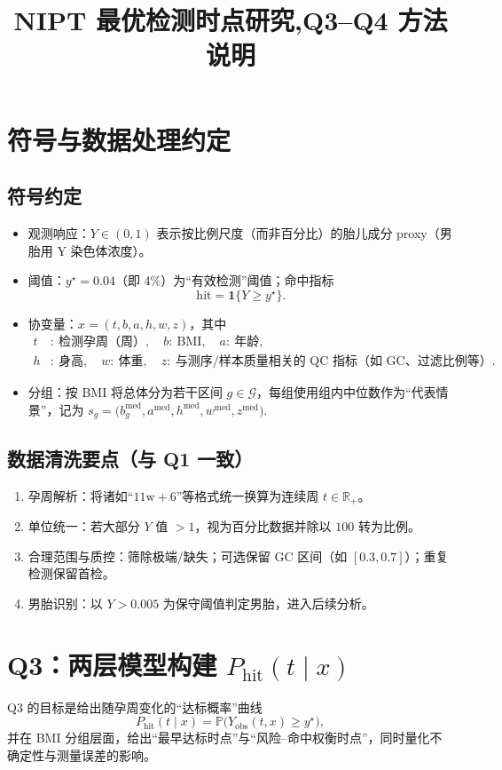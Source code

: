 \documentclass[11pt,a4paper]{article}
\title{NIPT 最优检测时点研究,Q3--Q4 方法说明}
\author{}
\date{}
\begin{document}
\maketitle
\tableofcontents

\section{符号与数据处理约定}
\subsection{符号约定}
\begin{itemize}
  \item 观测响应：$Y\in(0,1)$ 表示按比例尺度（而非百分比）的胎儿成分 proxy（男胎用 Y 染色体浓度）。
  \item 阈值：$y^\star=0.04$（即 4\%）为“有效检测”阈值；命中指标
  \[
    \text{hit} = \mathbf{1}\{Y \ge y^\star\}.
  \]
  \item 协变量：$x=(t, b, a, h, w, z)$，其中
  \begin{align*}
    t&:\ \text{检测孕周（周）},\quad
    b:\ \text{BMI},\quad
    a:\ \text{年龄},\\
    h&:\ \text{身高},\quad
    w:\ \text{体重},\quad
    z:\ \text{与测序/样本质量相关的 QC 指标（如 GC、过滤比例等）}.
  \end{align*}
  \item 分组：按 BMI 将总体分为若干区间 $g\in\mathcal{G}$，每组使用组内中位数作为“代表情景”，记为
  \(
  s_g=\bigl(b_g^{\text{med}}, a^{\text{med}}, h^{\text{med}}, w^{\text{med}}, z^{\text{med}}\bigr).
  \)
\end{itemize}

\subsection{数据清洗要点（与 Q1 一致）}
\begin{enumerate}
  \item 孕周解析：将诸如“$11\text{w}+6$”等格式统一换算为连续周 $t\in\mathbb{R}_+$。
  \item 单位统一：若大部分 $Y$ 值 $>1$，视为百分比数据并除以 $100$ 转为比例。
  \item 合理范围与质控：筛除极端/缺失；可选保留 GC 区间（如 $[0.3,0.7]$）；重复检测保留首检。
  \item 男胎识别：以 $Y>0.005$ 为保守阈值判定男胎，进入后续分析。
\end{enumerate}

\section{Q3：两层模型构建 $P_{\text{hit}}(t\mid x)$}
Q3 的目标是给出随孕周变化的“达标概率”曲线
\[
  P_{\text{hit}}(t\mid x)=\mathbb{P}\bigl(Y_{\text{obs}}(t,x)\ge y^\star\bigr),
\]
并在 BMI 分组层面，给出“最早达标时点”与“风险--命中权衡时点”，同时量化不确定性与测量误差的影响。
\end{document}
